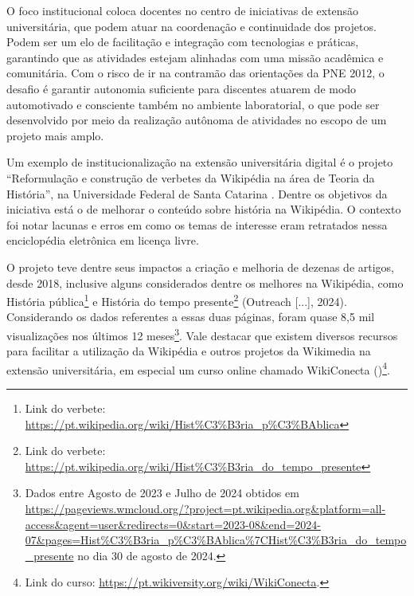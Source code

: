 \documentclass[portuguese]{textolivre}
\begin{document}
O foco institucional coloca docentes no centro de iniciativas de
extensão universitária, que podem atuar na coordenação e continuidade
dos projetos. Podem ser um elo de facilitação e integração com
tecnologias e práticas, garantindo que as atividades estejam alinhadas
com uma missão acadêmica e comunitária. Com o risco de ir na contramão
das orientações da PNE 2012, o desafio é garantir autonomia suficiente
para discentes atuarem de modo automotivado e consciente também no
ambiente laboratorial, o que pode ser desenvolvido por meio da
realização autônoma de atividades no escopo de um projeto mais amplo.

Um exemplo de institucionalização na extensão universitária digital é o
projeto ``Reformulação e construção de verbetes da Wikipédia na área de
Teoria da História'', na Universidade Federal de Santa Catarina
\cite{Varella2020}. Dentre os objetivos da iniciativa está o de
melhorar o conteúdo sobre história na Wikipédia. O contexto foi notar
lacunas e erros em como os temas de interesse eram retratados nessa
enciclopédia eletrônica em licença livre.

O projeto teve dentre seus impactos a criação e melhoria de dezenas de
artigos, desde 2018, inclusive alguns considerados dentre os melhores na
Wikipédia, como História pública\footnote{Link do
  verbete:
  \url{https://pt.wikipedia.org/wiki/Hist\%C3\%B3ria_p\%C3\%BAblica}} e
História do tempo presente\footnote{Link do verbete:
  \url{https://pt.wikipedia.org/wiki/Hist\%C3\%B3ria_do_tempo_presente}}
(Outreach {[}...{]}, 2024). Considerando os dados referentes a essas
duas páginas, foram quase 8,5 mil visualizações nos últimos 12
meses\footnote{Dados entre Agosto de 2023 e Julho de
  2024 obtidos em
  \url{https://pageviews.wmcloud.org/?project=pt.wikipedia.org\&platform=all-access\&agent=user\&redirects=0\&start=2023-08\&end=2024-07\&pages=Hist\%C3\%B3ria_p\%C3\%BAblica\%7CHist\%C3\%B3ria_do_tempo_presente}
  no dia 30 de agosto de 2024.}. Vale destacar que existem diversos
recursos para facilitar a utilização da Wikipédia e outros projetos da
Wikimedia na extensão universitária, em especial um curso online chamado
WikiConecta ()\footnote{Link do curso:
\url{https://pt.wikiversity.org/wiki/WikiConecta}.}.
\end{document}
